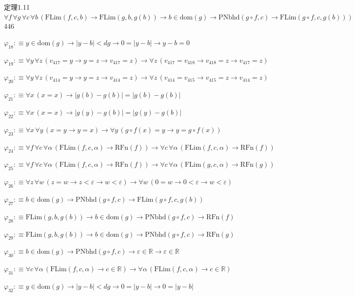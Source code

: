 \begin{fullproof}{定理1.11}{$\forall f\,\forall g\,\forall c\,\forall b\,(\mathrm{FLim}(f,c,b) \to \mathrm{FLim}(g,b,g(b)) \to b \in \mathrm{dom}(g) \to \mathrm{PNbhd}(g \circ f,c) \to \mathrm{FLim}(g \circ f,c,g(b)))$}{446}
\begin{abbrevlist}
\item $\varphi_{18} :\equiv y \in \mathrm{dom}(g) \to \lvert y - b \rvert < \mathit{dg} \to 0 = \lvert y - b \rvert \to y - b = 0$
\item $\varphi_{19} :\equiv \forall y\,\forall z\,(v_{417} = y \to y = z \to v_{417} = z) \to \forall z\,(v_{417} = v_{418} \to v_{418} = z \to v_{417} = z)$
\item $\varphi_{20} :\equiv \forall y\,\forall z\,(v_{414} = y \to y = z \to v_{414} = z) \to \forall z\,(v_{414} = v_{415} \to v_{415} = z \to v_{414} = z)$
\item $\varphi_{21} :\equiv \forall x\,(x = x) \to \lvert g(b) - g(b) \rvert = \lvert g(b) - g(b) \rvert$
\item $\varphi_{22} :\equiv \forall x\,(x = x) \to \lvert g(y) - g(b) \rvert = \lvert g(y) - g(b) \rvert$
\item $\varphi_{23} :\equiv \forall x\,\forall y\,(x = y \to y = x) \to \forall y\,(g \circ f(x) = y \to y = g \circ f(x))$
\item $\varphi_{24} :\equiv \forall f\,\forall c\,\forall \alpha\,(\mathrm{FLim}(f,c,\alpha) \to \mathrm{RFn}(f)) \to \forall c\,\forall \alpha\,(\mathrm{FLim}(f,c,\alpha) \to \mathrm{RFn}(f))$
\item $\varphi_{25} :\equiv \forall f\,\forall c\,\forall \alpha\,(\mathrm{FLim}(f,c,\alpha) \to \mathrm{RFn}(f)) \to \forall c\,\forall \alpha\,(\mathrm{FLim}(g,c,\alpha) \to \mathrm{RFn}(g))$
\item $\varphi_{26} :\equiv \forall z\,\forall w\,(z = w \to z < \varepsilon \to w < \varepsilon) \to \forall w\,(0 = w \to 0 < \varepsilon \to w < \varepsilon)$
\item $\varphi_{27} :\equiv b \in \mathrm{dom}(g) \to \mathrm{PNbhd}(g \circ f,c) \to \mathrm{FLim}(g \circ f,c,g(b))$
\item $\varphi_{28} :\equiv \mathrm{FLim}(g,b,g(b)) \to b \in \mathrm{dom}(g) \to \mathrm{PNbhd}(g \circ f,c) \to \mathrm{RFn}(f)$
\item $\varphi_{29} :\equiv \mathrm{FLim}(g,b,g(b)) \to b \in \mathrm{dom}(g) \to \mathrm{PNbhd}(g \circ f,c) \to \mathrm{RFn}(g)$
\item $\varphi_{30} :\equiv b \in \mathrm{dom}(g) \to \mathrm{PNbhd}(g \circ f,c) \to \varepsilon \in \mathbb{R} \to \varepsilon \in \mathbb{R}$
\item $\varphi_{31} :\equiv \forall c\,\forall \alpha\,(\mathrm{FLim}(f,c,\alpha) \to c \in \mathbb{R}) \to \forall \alpha\,(\mathrm{FLim}(f,c,\alpha) \to c \in \mathbb{R})$
\item $\varphi_{32} :\equiv y \in \mathrm{dom}(g) \to \lvert y - b \rvert < \mathit{dg} \to 0 = \lvert y - b \rvert \to 0 = \lvert y - b \rvert$

\end{abbrevlist}
\end{fullproof}
